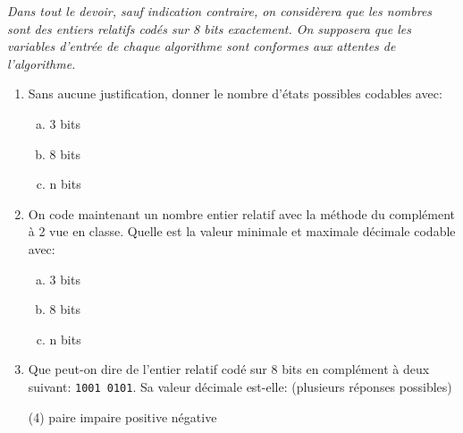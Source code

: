 \documentclass[a4paper,10pt]{report}
\def\ptsexoA{4}
\begin{document}

\renewcommand{\labelitemi}{\textbullet} %


\pagestyle{DS_FP}          %
\NomPrenomNote{}

\emph{Dans tout le devoir, sauf indication contraire, on considèrera que les nombres sont des entiers relatifs codés sur 8 bits exactement. On supposera que les variables d'entrée de chaque algorithme sont conformes aux attentes de l'algorithme.
}
\bigskip

\exods{\ptsexoA}

\begin{enumerate}
    \item Sans aucune justification, donner le nombre d'états possibles codables avec:
    
\begin{enumerate}[a)]
    \item 3 bits \dotfill{}
    \item 8 bits \dotfill{}
    \item n bits \dotfill{}
\end{enumerate}

\item On code maintenant un nombre entier relatif avec la méthode du complément à 2 vue en classe. Quelle est la valeur minimale et maximale décimale codable avec:

\begin{enumerate}[a)]
    \item 3 bits \dotfill{}
    \item 8 bits \dotfill{}
    \item n bits \dotfill{}
\end{enumerate}

\item Que peut-on dire de l'entier relatif codé sur 8 bits en complément à deux suivant: \verb|1001 0101|. Sa valeur décimale est-elle: (plusieurs réponses possibles)

\begin{tasks}(4)
    \task[$\bigcirc$] paire
    \task[$\bigcirc$] impaire
    \task[$\bigcirc$] positive
    \task[$\bigcirc$] négative
\end{tasks}

\end{enumerate}
\end{document}
